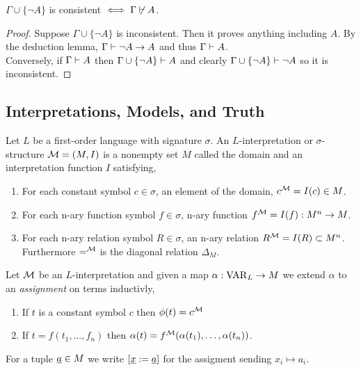 \documentclass[12pt]{article}
\begin{document}
\begin{lemma}
$\Gamma \cup \{ \neg A \}$ is consistent $\iff \Gamma \not\vdash A$.
\end{lemma}

\begin{proof}
Suppose $\Gamma \cup \{ \neg A \}$ is inconsistent. Then it proves anything including $A$. By the deduction lemma, $\Gamma \vdash \neg A \to A$ and thus $\Gamma \vdash A$.
\bigskip\\
Conversely,
if $\Gamma \vdash A$ then $\Gamma \cup \{ \neg A \} \vdash A$ and clearly $\Gamma \cup \{ \neg A \} \vdash \neg A$ so it is inconsistent. 
\end{proof}

\subsection{Interpretations, Models, and Truth}

\begin{definition}
Let $L$ be a first-order language with signature $\sigma$. An $L$-interpretation or $\sigma$-structure $\mathcal{M} = (M, I)$ is a nonempty set $M$ called the domain and an interpretation function $I$ satisfying,
\begin{enumerate}
\item For each constant symbol $c \in \sigma$, an element of the domain, $c^{\mathcal{M}} = I(c) \in M$.
\item For each n-ary function symbol $f \in \sigma$, n-ary function $f^{\mathcal{M}} = I(f) : M^n \to M$.
\item For each n-ary relation symbol $R \in \sigma$, an n-ary relation $R^{\mathcal{M}} = I(R) \subset M^n$. Furthermore $=^{\mathcal{M}}$ is the diagonal relation $\Delta_M$.
\end{enumerate}
\end{definition}

\begin{definition}
Let $\mathcal{M}$ be an $L$-interpretation and given a map $\alpha : \mathrm{VAR}_{L} \to M$ we extend $\alpha$ to an \textit{assignment} on terms inductivly,
\begin{enumerate}
\item If $t$ is a constant symbol $c$ then $\phi(t) = c^{\mathcal{M}}$
\item If $t = f(t_1, \dots, f_n)$ then $\alpha(t) = f^{\mathcal{M}}(\alpha(t_1), \dots, \alpha(t_n))$.  
\end{enumerate} 
For a tuple $\underline{a} \in M$ we write $[\underline{x} := \underline{a}]$ for the assigment sending $x_i \mapsto a_i$.
\end{definition}
\end{document}
